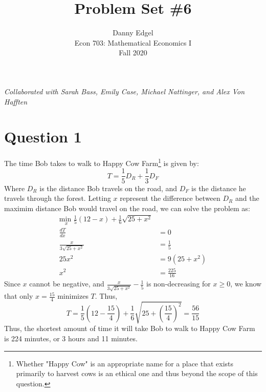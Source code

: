 \documentclass{article}
\newcommand{\usmin}[1]{\underset{#1}{\text{min }}}
\begin{document}
\title{	Problem Set \#6 }
\author{ 	Danny Edgel 							\\ 
			Econ 703: Mathematical Economics I		\\
			Fall 2020								\\
		}
\maketitle\thispagestyle{empty}


\textit{Collaborated with Sarah Bass, Emily Case, Michael Nattinger, and Alex Von Hafften}


\section*{Question 1}
The time Bob takes to walk to Happy Cow Farm\footnote{Whether "Happy Cow" is an appropriate name for a place that exists primarily to harvest cows is an ethical one and thus beyond the scope of this question.} is given by:
\[
	T = \frac{1}{5}D_R + \frac{1}{3}D_F
\]
Where $D_R$ is the distance Bob travels on the road, and $D_F$ is the distance he travels through the forest. Letting $x$ represent the difference between $D_R$ and the maximim distance Bob would travel on the road, we can solve the problem as:
\begin{align*}
	\usmin{x}\frac{1}{5}(12-x) + \frac{1}{6}\sqrt{25 + x^2}	\\
	\frac{dT}{dx} 						&= 0			 	\\
	\frac{x}{3\sqrt{25+x^2}}			&= \frac{1}{5}		\\
	25x^2								&= 9(25 + x^2)		\\
	x^2									&= \frac{225}{16}	
\end{align*}
Since $x$ cannot be negative, and $\frac{x}{3\sqrt{25+x^2}}-\frac{1}{5}$ is non-decreasing for $x\geq 0$, we know that only $x=\frac{15}{4}$ minimizes $T$. Thus,
\[
	T = \frac{1}{5}(12-\frac{15}{4}) + \frac{1}{6}\sqrt{25 + \left(\frac{15}{4}\right)^2} = \frac{56}{15}
\]
Thus, the shortest amount of time it will take Bob to walk to Happy Cow Farm is 224 minutes, or 3 hours and 11 minutes.
	
\end{document}
